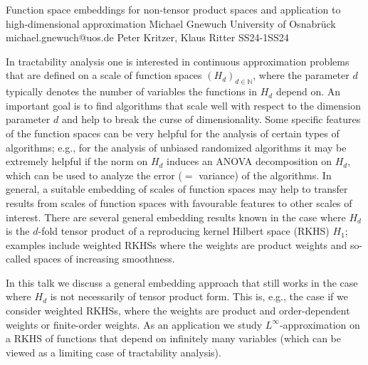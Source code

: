 \begin{talk}
  {Function space embeddings for non-tensor product spaces and application to high-dimensional approximation}%
  {Michael Gnewuch}%
  {University of Osnabr\"uck}%
  {michael.gnewuch@uos.de}%
  {Peter Kritzer, Klaus Ritter}%
{}{}{SS24-1}{SS24}

			




In tractability analysis one is interested in continuous approximation problems
that are defined on a scale of function spaces $(H_d)_{d\in {\mathbb N}}$, where the parameter
$d$ typically denotes the number of variables the functions in $H_d$ depend on.
An important goal is to find algorithms that scale well with respect to the dimension parameter $d$ and help to break the curse of dimensionality. 
Some specific features of the function spaces can be very helpful for the analysis of certain types of algorithms; e.g., for the analysis of unbiased randomized algorithms it may be extremely helpful if the norm on $H_d$ induces an ANOVA decomposition on $H_d$, which can be used to analyze the error ($=$ variance) of the algorithms. 
In general, a suitable embedding of scales of function spaces may help to transfer results from scales of function spaces with favourable features to other scales of interest. There are several general embedding results known in the case where $H_d$ is the $d$-fold tensor product of a reproducing kernel Hilbert space (RKHS) 
$H_1$; examples include weighted RKHSs where the weights are product weights and so-called spaces of increasing smoothness.

In this talk we discuss a general embedding approach that still works in the case where $H_d$ is not necessarily of tensor product form. This is, e.g., the case if we consider weighted RKHSs, where the weights are product and order-dependent weights or finite-order weights. As an application we study $L^\infty$-approximation on a RKHS of functions that depend on infinitely many variables (which can be viewed as a limiting case of tractability analysis).




\end{talk}

